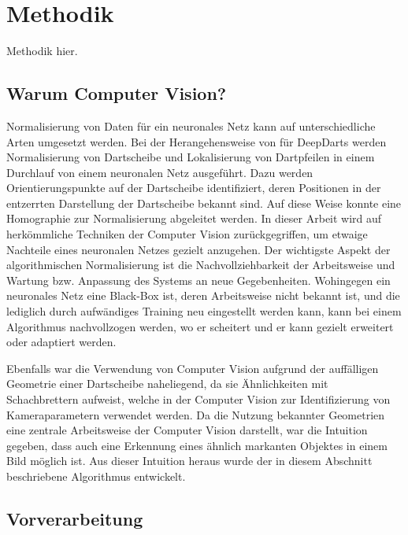 
\section{Methodik}
\label{sec:cv:methodik}

Methodik hier.

\subsection{Warum Computer Vision?}
\label{sec:warum_cv}

Normalisierung von Daten für ein neuronales Netz kann auf unterschiedliche Arten umgesetzt werden. Bei der Herangehensweise von \citeauthor{deepdarts} für DeepDarts werden Normalisierung von Dartscheibe und Lokalisierung von Dartpfeilen in einem Durchlauf von einem neuronalen Netz ausgeführt. Dazu werden Orientierungspunkte auf der Dartscheibe identifiziert, deren Positionen in der entzerrten Darstellung der Dartscheibe bekannt sind. Auf diese Weise konnte eine Homographie zur Normalisierung abgeleitet werden. In dieser Arbeit wird auf herkömmliche Techniken der Computer Vision zurückgegriffen, um etwaige Nachteile eines neuronalen Netzes gezielt anzugehen. Der wichtigste Aspekt der algorithmischen Normalisierung ist die Nachvollziehbarkeit der Arbeitsweise und Wartung bzw. Anpassung des Systems an neue Gegebenheiten. Wohingegen ein neuronales Netz eine Black-Box ist, deren Arbeitsweise nicht bekannt ist, und die lediglich durch aufwändiges Training neu eingestellt werden kann, kann bei einem Algorithmus nachvollzogen werden, wo er scheitert und er kann gezielt erweitert oder adaptiert werden.

Ebenfalls war die Verwendung von Computer Vision aufgrund der auffälligen Geometrie einer Dartscheibe naheliegend, da sie Ähnlichkeiten mit Schachbrettern aufweist, welche in der Computer Vision zur Identifizierung von Kameraparametern verwendet werden. Da die Nutzung bekannter Geometrien eine zentrale Arbeitsweise der Computer Vision darstellt, war die Intuition gegeben, dass auch eine Erkennung eines ähnlich markanten Objektes in einem Bild möglich ist. Aus dieser Intuition heraus wurde der in diesem Abschnitt beschriebene Algorithmus entwickelt.

\subsection{Vorverarbeitung}
\label{sec:vorverarbeitung}

